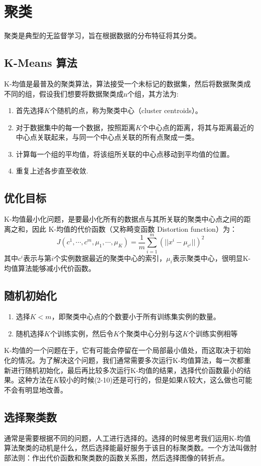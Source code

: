 \documentclass[cn,hazy,blue,normal,14pt]{elegantnote}
\begin{document}
\section{聚类}
聚类是典型的无监督学习，旨在根据数据的分布特征将其分类。
\subsection{K-Means 算法}
K-均值是最普及的聚类算法，算法接受一个未标记的数据集，然后将数据聚类成不同的组，假设我们想要将数据聚类成n个组，其方法为:
\begin{enumerate}
    \item 首先选择$K$个随机的点，称为聚类中心（cluster centroids）。
    \item 对于数据集中的每一个数据，按照距离$K$个中心点的距离，将其与距离最近的中心点关联起来，与同一个中心点关联的所有点聚成一类。
    \item 计算每一个组的平均值，将该组所关联的中心点移动到平均值的位置。
    \item 重复上述各步直至收敛.
\end{enumerate}
\subsection{优化目标}
K-均值最小化问题，是要最小化所有的数据点与其所关联的聚类中心点之间的距离之和，因此 K-均值的代价函数（又称畸变函数 Distortion function）为：
$$
J(c^1,\cdots,c^m,\mu_1,\cdots,\mu_K)=\frac{1}{m}\sum_{i=1}^{m}(||x^i-\mu_{c^i}||)^2
$$
其中$c^i$表示与第$i$个实例数据最近的聚类中心的索引，$\mu_i$表示聚类中心，很明显K-均值算法能够减小代价函数。
\subsection{随机初始化}
\begin{enumerate}
    \item 选择$K<m$，即聚类中心点的个数要小于所有训练集实例的数量。
    \item 随机选择$K$个训练实例，然后令$K$个聚类中心分别与这$K$个训练实例相等
\end{enumerate}

K-均值的一个问题在于，它有可能会停留在一个局部最小值处，而这取决于初始化的情况。为了解决这个问题，我们通常需要多次运行K-均值算法，每一次都重新进行随机初始化，最后再比较多次运行K-均值的结果，选择代价函数最小的结果。这种方法在$K$较小的时候(2-10)还是可行的，但是如果$K$较大，这么做也可能不会有明显地改善。
\subsection{选择聚类数}
通常是需要根据不同的问题，人工进行选择的。选择的时候思考我们运用K-均值算法聚类的动机是什么，然后选择能最好服务于该目的标聚类数。一个方法叫做肘部法则：作出代价函数和聚类数的函数关系图，然后选择图像的转折点。
\end{document}
